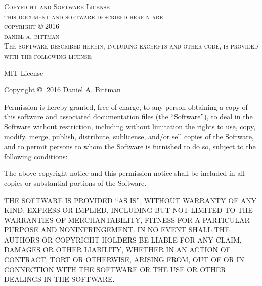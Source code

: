 \documentclass[12pt]{article}
\begin{document}
\begin{center}
	\textsc{{\Large Copyright and Software License}}\\
	\vspace{1in}
	\textsc{this document and software described herein are\\\vspace{5mm}copyright} \copyright $\;$\textsc{2016\\daniel a. bittman}\\
	\vspace{1in}
	\textsc{The software described herein, including excerpts and other code, is provided with the following license:}

	MIT License

Copyright \copyright $\;$ 2016 Daniel A. Bittman

Permission is hereby granted, free of charge, to any person obtaining a copy
of this software and associated documentation files (the ``Software''), to deal
in the Software without restriction, including without limitation the rights
to use, copy, modify, merge, publish, distribute, sublicense, and/or sell
copies of the Software, and to permit persons to whom the Software is
furnished to do so, subject to the following conditions:

The above copyright notice and this permission notice shall be included in all
copies or substantial portions of the Software.

THE SOFTWARE IS PROVIDED ``AS IS'', WITHOUT WARRANTY OF ANY KIND, EXPRESS OR
IMPLIED, INCLUDING BUT NOT LIMITED TO THE WARRANTIES OF MERCHANTABILITY,
FITNESS FOR A PARTICULAR PURPOSE AND NONINFRINGEMENT. IN NO EVENT SHALL THE
AUTHORS OR COPYRIGHT HOLDERS BE LIABLE FOR ANY CLAIM, DAMAGES OR OTHER
LIABILITY, WHETHER IN AN ACTION OF CONTRACT, TORT OR OTHERWISE, ARISING FROM,
OUT OF OR IN CONNECTION WITH THE SOFTWARE OR THE USE OR OTHER DEALINGS IN THE
SOFTWARE.

\end{center}
\clearpage
\end{document}

